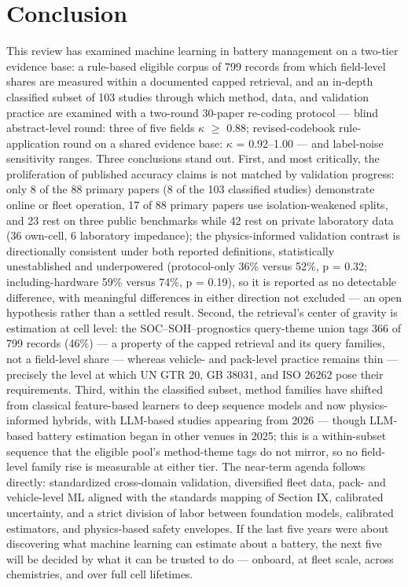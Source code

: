 \documentclass[journal]{IEEEtran}
\begin{document}
\section{Conclusion}

This review has examined machine learning in battery management on a two-tier evidence base: a rule-based eligible corpus of 799 records from which field-level shares are measured within a documented capped retrieval, and an in-depth classified subset of 103 studies through which method, data, and validation practice are examined with a two-round 30-paper re-coding protocol --- blind abstract-level round: three of five fields $\kappa$ $\ge$ 0.88; revised-codebook rule-application round on a shared evidence base: $\kappa$ = 0.92--1.00 --- and label-noise sensitivity ranges. Three conclusions stand out. First, and most critically, the proliferation of published accuracy claims is not matched by validation progress: only 8 of the 88 primary papers (8 of the 103 classified studies) demonstrate online or fleet operation, 17 of 88 primary papers use isolation-weakened splits, and 23 rest on three public benchmarks while 42 rest on private laboratory data (36 own-cell, 6 laboratory impedance); the physics-informed validation contrast is directionally consistent under both reported definitions, statistically unestablished and underpowered (protocol-only 36\% versus 52\%, p = 0.32; including-hardware 59\% versus 74\%, p = 0.19), so it is reported as no detectable difference, with meaningful differences in either direction not excluded --- an open hypothesis rather than a settled result. Second, the retrieval's center of gravity is estimation at cell level: the SOC--SOH--prognostics query-theme union tags 366 of 799 records (46\%) --- a property of the capped retrieval and its query families, not a field-level share --- whereas vehicle- and pack-level practice remains thin --- precisely the level at which UN GTR 20, GB 38031, and ISO 26262 pose their requirements. Third, within the classified subset, method families have shifted from classical feature-based learners to deep sequence models and now physics-informed hybrids, with LLM-based studies appearing from 2026 --- though LLM-based battery estimation began in other venues in 2025; this is a within-subset sequence that the eligible pool's method-theme tags do not mirror, so no field-level family rise is measurable at either tier. The near-term agenda follows directly: standardized cross-domain validation, diversified fleet data, pack- and vehicle-level ML aligned with the standards mapping of Section IX, calibrated uncertainty, and a strict division of labor between foundation models, calibrated estimators, and physics-based safety envelopes. If the last five years were about discovering what machine learning can estimate about a battery, the next five will be decided by what it can be trusted to do --- onboard, at fleet scale, across chemistries, and over full cell lifetimes.
\end{document}
